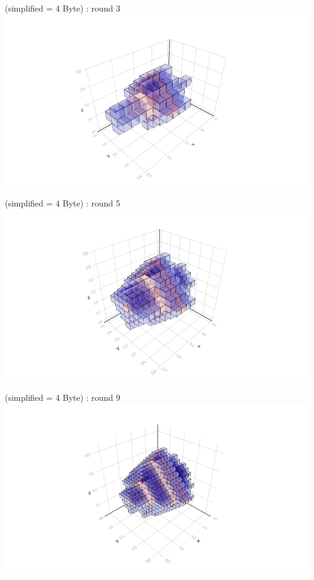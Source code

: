 \documentclass{beamer}
\begin{document}
\begin{frame}{\insertsubsection (simplified = 4 Byte) : round 3}
  \centering\includegraphics[trim=5cm 0.7cm 5cm 3cm, clip, width=1\linewidth]{algorithm_visualisation/srgcache4/srgcache_step2.png}\\
\end{frame}
\begin{frame}{\insertsubsection (simplified = 4 Byte) : round 5}
  \centering\includegraphics[trim=5cm 0.7cm 5cm 3cm, clip, width=1\linewidth]{algorithm_visualisation/srgcache4/srgcache_step4.png}\\
\end{frame}
\begin{frame}{\insertsubsection (simplified = 4 Byte) : round 9}
  \centering\includegraphics[trim=5cm 0.7cm 5cm 3cm, clip, width=1\linewidth]{algorithm_visualisation/srgcache4/srgcache_step8.png}\\
\end{frame}
\end{document}
